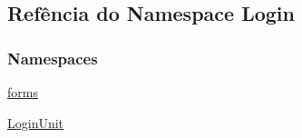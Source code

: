 \hypertarget{namespaceLogin}{}\subsection{Refência do Namespace Login}
\label{namespaceLogin}
\subsubsection*{Namespaces}
\begin{DoxyCompactItemize}
\item 
 \hyperlink{namespaceLogin_1_1forms}{forms}
\item 
 \hyperlink{namespaceLogin_1_1LoginUnit}{Login\+Unit}
\end{DoxyCompactItemize}
